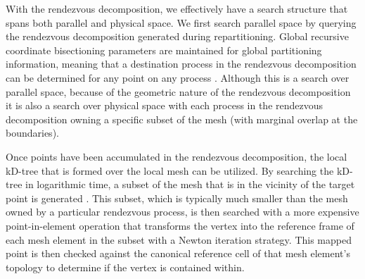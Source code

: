 \documentclass{mc2013}
\begin{document}
With the rendezvous decomposition, we effectively have a search
structure that spans both parallel and physical space. We first search
parallel space by querying the rendezvous decomposition generated
during repartitioning. Global recursive coordinate bisectioning
parameters are maintained for global partitioning information, meaning
that a destination process in the rendezvous decomposition can be
determined for any point on any process \cite{Berger_1987}. Although
this is a search over parallel space, because of the geometric nature
of the rendezvous decomposition it is also a search over physical
space with each process in the rendezvous decomposition owning a
specific subset of the mesh (with marginal overlap at the boundaries).
 
Once points have been accumulated in the rendezvous decomposition, the
local kD-tree that is formed over the local mesh can be utilized. By
searching the kD-tree in logarithmic time, a subset of the mesh that
is in the vicinity of the target point is generated
\cite{Bentley_1975}. This subset, which is typically much smaller than
the mesh owned by a particular rendezvous process, is then searched
with a more expensive point-in-element operation that transforms the
vertex into the reference frame of each mesh element in the subset
with a Newton iteration strategy. This mapped point is then checked
against the canonical reference cell of that mesh element's topology
to determine if the vertex is contained within.

\end{document}
